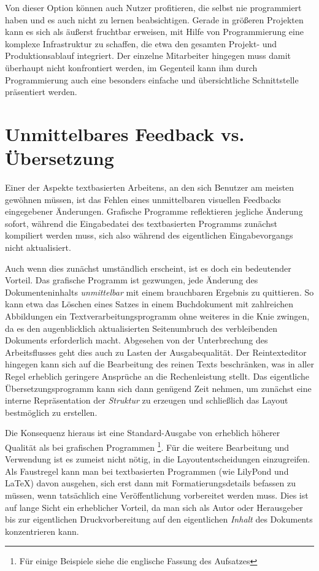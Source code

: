\documentclass[DIV=12]{scrreprt}
\begin{document}
Von dieser Option können auch Nutzer profitieren, die selbst nie programmiert haben und es auch nicht zu lernen beabsichtigen.
Gerade in größeren Projekten kann es sich als äußerst fruchtbar erweisen, mit Hilfe von Programmierung eine komplexe Infrastruktur zu schaffen, die etwa den gesamten Projekt- und Produktionsablauf integriert.
Der einzelne Mitarbeiter hingegen muss damit überhaupt nicht konfrontiert werden, im Gegenteil kann ihm durch Programmierung auch eine besonders einfache und übersichtliche Schnittstelle präsentiert werden.


\section{Unmittelbares Feedback vs. Übersetzung}
\label{sec:pt_compiling-instant}
Einer der Aspekte textbasierten Arbeitens, an den sich Benutzer am meisten gewöhnen müssen, ist das Fehlen eines unmittelbaren visuellen Feedbacks eingegebener Änderungen.
Grafische Programme reflektieren jegliche Änderung sofort, während die Eingabedatei des textbasierten Programms zunächst kompiliert werden muss, sich also während des eigentlichen Eingabevorgangs nicht aktualisiert.

Auch wenn dies zunächst umständlich erscheint, ist es doch ein bedeutender Vorteil.
Das grafische Programm ist gezwungen, jede Änderung des Dokumenteninhalts \emph{unmittelbar} mit einem brauchbaren Ergebnis zu quittieren.
So kann etwa das Löschen eines Satzes in einem Buchdokument mit zahlreichen Abbildungen ein Textverarbeitungsprogramm ohne weiteres in die Knie zwingen, da es den augenblicklich aktualisierten Seitenumbruch des verbleibenden Dokuments erforderlich macht.
Abgesehen von der Unterbrechung des Arbeitsflusses geht dies auch zu Lasten der Ausgabequalität.
Der Reintexteditor hingegen kann sich auf die Bearbeitung des reinen Texts beschränken, was in aller Regel erheblich geringere Ansprüche an die Rechenleistung stellt.
Das eigentliche Übersetzungsprogramm kann sich dann genügend Zeit nehmen, um zunächst eine interne Repräsentation der \emph{Struktur} zu erzeugen und schließlich das Layout bestmöglich zu erstellen.

Die Konsequenz hieraus ist eine Standard-Ausgabe von erheblich höherer Qualität als bei grafischen Programmen%
\footnote{Für einige Beispiele siehe die englische Fassung des Aufsatzes}.
Für die weitere Bearbeitung und Verwendung ist es zumeist nicht nötig, in die Layout\-entscheidungen einzugreifen.
Als Faustregel kann man bei textbasierten Programmen (wie LilyPond und \LaTeX) davon ausgehen, sich erst dann mit Formatierungsdetails befassen zu müssen, wenn tatsächlich eine Veröffentlichung vorbereitet werden muss.
Dies ist auf lange Sicht ein erheblicher Vorteil, da man sich als Autor oder Herausgeber bis zur eigentlichen Druckvorbereitung auf den eigentlichen \emph{Inhalt} des Dokuments konzentrieren kann.
\end{document}
